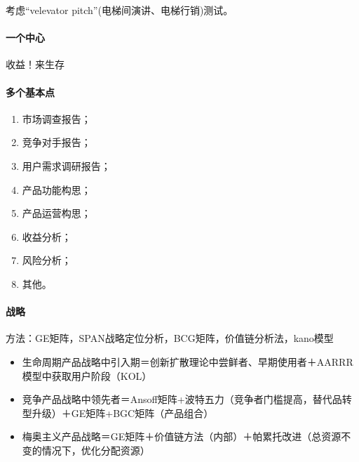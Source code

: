 \documentclass[letterpaper,11pt,english]{sphinxmanual}
\begin{document}
考虑“velevator pitch”(电梯间演讲、电梯行销)测试。


\paragraph{一个中心}
\label{\detokenize{chapter_knowledge/BRD:id6}}
收益！来生存


\paragraph{多个基本点}
\label{\detokenize{chapter_knowledge/BRD:id7}}\begin{enumerate}
%
\item {} 
市场调查报告；

\item {} 
竞争对手报告；

\item {} 
用户需求调研报告；

\item {} 
产品功能构思；

\item {} 
产品运营构思；

\item {} 
收益分析；

\item {} 
风险分析；

\item {} 
其他。

\end{enumerate}


\paragraph{战略}
\label{\detokenize{chapter_knowledge/BRD:id8}}
方法：GE矩阵，SPAN战略定位分析，BCG矩阵，价值链分析法，kano模型
%
\begin{footnote}[414]\sphinxAtStartFootnote
{}
%
\end{footnote}
\begin{itemize}
\item {} 
生命周期产品战略中引入期＝创新扩散理论中尝鲜者、早期使用者＋AARRR模型中获取用户阶段（KOL）

\item {} 
竞争产品战略中领先者＝Ansoff矩阵+波特五力（竞争者门槛提高，替代品转型升级）＋GE矩阵+BGC矩阵（产品组合）

\item {} 
梅奥主义产品战略＝GE矩阵＋价值链方法（内部）＋帕累托改进（总资源不变的情况下，优化分配资源）

\end{itemize}
\end{document}
